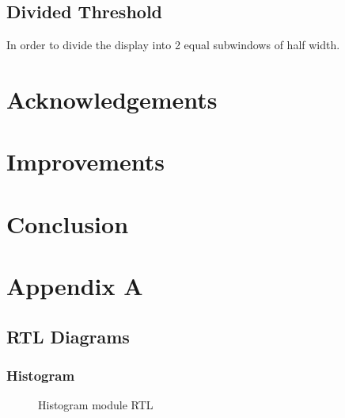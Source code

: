\documentclass[12pt]{article}
\begin{document}
  \subsection{Divided Threshold}
  In order to divide the display into 2 equal subwindows of half width.


  \section{Acknowledgements}
  
  \section{Improvements}
  
  \section{Conclusion}
  
  \newpage
  \section{Appendix A}
  \subsection{RTL Diagrams}
  \subsubsection{Histogram}
  \begin{figure}[H]
    \ContinuedFloat
    \caption{Histogram module RTL}
    \label{fig:histogram_rtl}
  \end{figure}
  
  
  
  
\end{document}
